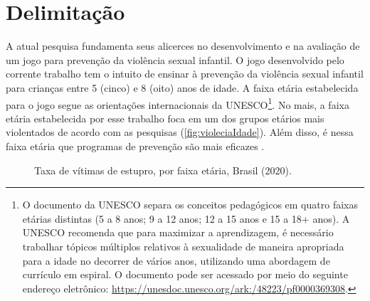 
\section{Delimitação}\label{sec:Escopo}

A atual pesquisa fundamenta seus alicerces no desenvolvimento e na avaliação de um jogo para prevenção da violência sexual infantil. O jogo desenvolvido pelo corrente trabalho tem o intuito de ensinar à prevenção da violência sexual infantil para crianças entre 5 (cinco) e 8 (oito) anos de idade. A faixa etária estabelecida para o jogo segue as orientações internacionais da \ac{UNESCO}\footnote{O documento da UNESCO separa os conceitos pedagógicos em quatro faixas etárias distintas (5 a 8 anos; 9 a 12 anos; 12 a 15 anos e 15 a 18+ anos). A \ac{UNESCO} recomenda que para maximizar a aprendizagem, é necessário trabalhar tópicos múltiplos relativos à sexualidade de maneira apropriada para a idade no decorrer de vários anos, utilizando uma abordagem de currículo em espiral. O documento pode ser acessado por meio do seguinte endereço eletrônico: \url{https://unesdoc.unesco.org/ark:/48223/pf0000369308}.}. No mais, a faixa etária estabelecida por esse trabalho foca em um dos grupos etários mais violentados de acordo com as pesquisas (\autoref{fig:violeciaIdade}). Além disso, é nessa faixa etária que programas de prevenção são mais eficazes \cite{davis2000child}.

\begin{figure}[htb]
	\caption{Taxa de vítimas de estupro, por faixa etária, Brasil (2020).}\label{fig:violeciaIdade}
	\vspace{-0.3cm}
\end{figure}



